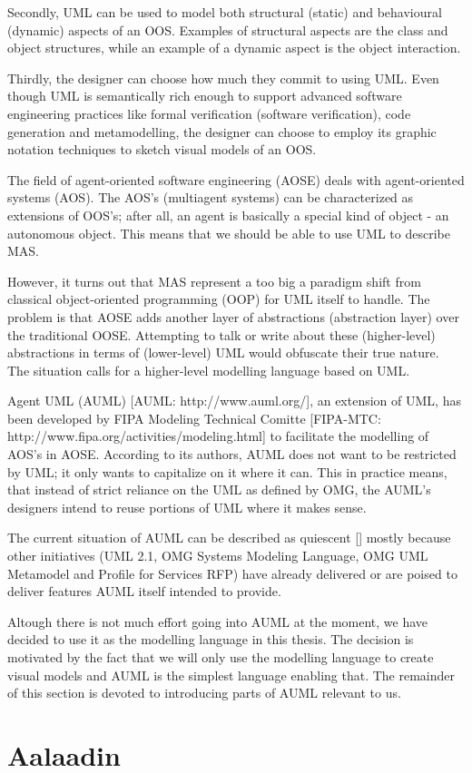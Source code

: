 Secondly, UML can be used to model both structural (static) and behavioural (dynamic) aspects of an OOS.
Examples of structural aspects are the class and object structures, while an example of a dynamic aspect is the object interaction.

Thirdly, the designer can choose how much they commit to using UML.
Even though UML is semantically rich enough to support advanced software engineering practices like formal verification (software verification), code generation and metamodelling, the designer can choose to employ its graphic notation techniques to sketch visual models of an OOS.


The field of agent-oriented software engineering (AOSE) deals with agent-oriented systems (AOS).
The AOS's (multiagent systems) can be characterized as extensions of OOS's; after all, an agent is basically a special kind of object - an autonomous object.
This means that we should be able to use UML to describe MAS.

However, it turns out that MAS represent a too big a paradigm shift from classical object-oriented programming (OOP) for UML itself to handle.
The problem is that AOSE adds another layer of abstractions (abstraction layer) over the traditional OOSE.
Attempting to talk or write about these (higher-level) abstractions in terms of (lower-level) UML would obfuscate their true nature.
The situation calls for a higher-level modelling language based on UML.

Agent UML (AUML) [AUML: http://www.auml.org/], an extension of UML, has been developed by FIPA Modeling Technical Comitte [FIPA-MTC: http://www.fipa.org/activities/modeling.html] to facilitate the modelling of AOS's in AOSE.
According to its authors, AUML does not want to be restricted by UML; it only wants to capitalize on it where it can.
This in practice means, that instead of strict reliance on the UML as defined by OMG, the AUML's designers intend to reuse portions of UML where it makes sense.

The current situation of AUML can be described as quiescent [] mostly because other initiatives (UML 2.1, OMG Systems Modeling Language,  OMG UML Metamodel and Profile for Services RFP) have already delivered or are poised to deliver features AUML itself intended to provide.

Altough there is not much effort going into AUML at the moment, we have decided to use it as the modelling language in this thesis.
The decision is motivated by the fact that we will only use the modelling language to create visual models and AUML is the simplest language enabling that.
The remainder of this section is devoted to introducing parts of AUML relevant to us.

\section{Aalaadin}

